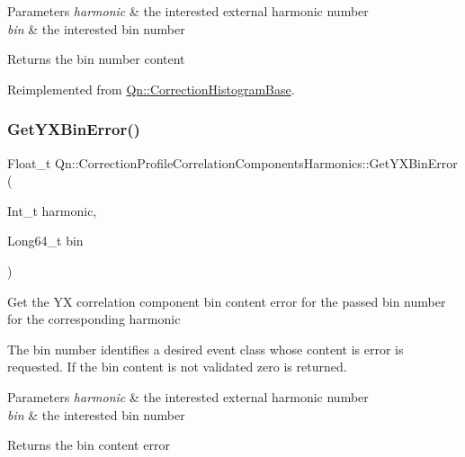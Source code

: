 \begin{DoxyParams}{Parameters}
{\em harmonic} & the interested external harmonic number \\
\hline
{\em bin} & the interested bin number \\
\hline
\end{DoxyParams}
\begin{DoxyReturn}{Returns}
the bin number content 
\end{DoxyReturn}


Reimplemented from \mbox{\hyperlink{classQn_1_1CorrectionHistogramBase_a15d59d5e8f2aaa3e42a133fd4b0f8025}{Qn\+::\+Correction\+Histogram\+Base}}.

\mbox{\label{classQn_1_1CorrectionProfileCorrelationComponentsHarmonics_a27ddadf86598339c7cc6bbdc8f5475fe}} 
\subsubsection{\texorpdfstring{Get\+Y\+X\+Bin\+Error()}{GetYXBinError()}}
{\footnotesize\ttfamily Float\+\_\+t Qn\+::\+Correction\+Profile\+Correlation\+Components\+Harmonics\+::\+Get\+Y\+X\+Bin\+Error (\begin{DoxyParamCaption}\item[{Int\+\_\+t}]{harmonic,  }\item[{Long64\+\_\+t}]{bin }\end{DoxyParamCaption})\hspace{0.3cm}{\ttfamily [virtual]}}

Get the YX correlation component bin content error for the passed bin number for the corresponding harmonic

The bin number identifies a desired event class whose content is error is requested. If the bin content is not validated zero is returned.


\begin{DoxyParams}{Parameters}
{\em harmonic} & the interested external harmonic number \\
\hline
{\em bin} & the interested bin number \\
\hline
\end{DoxyParams}
\begin{DoxyReturn}{Returns}
the bin content error 
\end{DoxyReturn}


